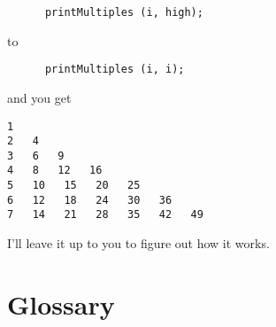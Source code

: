 \begin{lstlisting}
      printMultiples (i, high);
\end{lstlisting}
%
to

\begin{lstlisting}
      printMultiples (i, i);
\end{lstlisting}
%
and you get

\begin{lstlisting}
1   
2   4   
3   6   9   
4   8   12   16   
5   10   15   20   25   
6   12   18   24   30   36   
7   14   21   28   35   42   49  
\end{lstlisting}
%
I'll leave it up to you to figure out how it works.

\section{Glossary}

